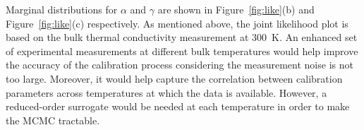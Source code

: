 Marginal distributions for
$\alpha$ and $\gamma$ are shown in Figure~\ref{fig:like}(b) and Figure~\ref{fig:like}(c) respectively. 
As mentioned above, the joint likelihood plot is based on the bulk thermal conductivity measurement at 300~K.
An enhanced set of experimental measurements at different bulk temperatures would help improve the
accuracy of the calibration process considering the measurement noise is not too large. Moreover, it would
help capture the correlation between calibration parameters across temperatures at which the data is
available. However, a reduced-order surrogate would be needed at each temperature in order to make the
MCMC tractable.  





















